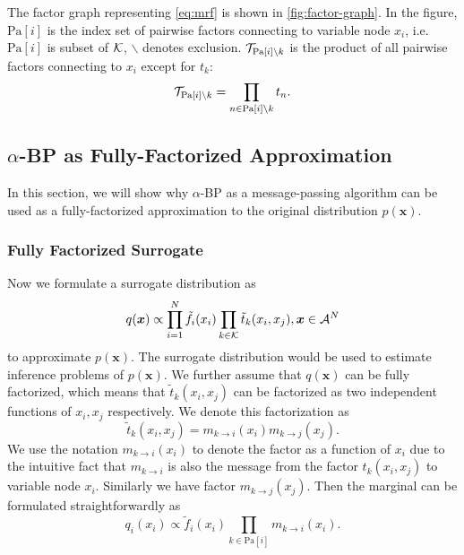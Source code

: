 \documentclass{article}
\begin{document}
The factor graph representing \autoref{eq:mrf} is shown in \autoref{fig:factor-graph}. In the figure, $\text{Pa}[i]$ is the index set of pairwise factors connecting to variable node $x_i$, i.e. $\text{Pa}[i]$ is subset of $\mathcal{K}$, $\backslash$ denotes exclusion. $\mathcal{T}_{\text{Pa}[i]\backslash k}$ is the product of all pairwise factors connecting to $x_i$ except for $t_k$:
\begin{equation}
  \mathcal{T}_{\text{Pa}[i]\backslash k} = \prod_{n \in \text{Pa}[i]\backslash k}t_n.
\end{equation}




\subsection{$\alpha$-BP as Fully-Factorized Approximation}
In this section, we will show why $\alpha$-BP as a message-passing algorithm can be used as a fully-factorized approximation to the original distribution $p(\bm{x})$. 





\subsubsection{Fully Factorized Surrogate}
Now we formulate a surrogate distribution as
\begin{equation}
  q(\bm{x}) \propto \prod_{{i=1}}^{N} \tilde{f}_i(x_i) \prod_{k\in \mathcal{K}} \tilde{t}_k(x_i, x_j), \bm{x} \in \mathcal{A}^N
\end{equation}
to approximate $p(\bm{x})$. The surrogate distribution would be used to estimate inference problems of $p(\bm{x})$. We further assume that $q(\bm{x})$ can be fully factorized, which means that $\tilde{t}_k(x_i, x_j)$ can be factorized as two independent functions of $x_i, x_j$ respectively. We denote this factorization as
\begin{equation}
  \tilde{t}_k(x_i, x_j) = m_{k\rightarrow i}(x_i) m_{k\rightarrow j}(x_j).
\end{equation}
We use the notation $m_{k\rightarrow i}(x_i)$ to denote the factor as a function of $x_i$ due to the intuitive fact that $m_{k\rightarrow i}$ is also the message from the factor $t_k(x_i, x_j)$ to variable node $x_i$. Similarly we have factor $m_{k\rightarrow j}(x_j)$. Then the marginal can be formulated straightforwardly as
\begin{equation}
  q_i(x_i) \propto \tilde{f}_i(x_i) \prod_{k\in \text{Pa}[i]} m_{k\rightarrow i}(x_i).
\end{equation}
\end{document}
